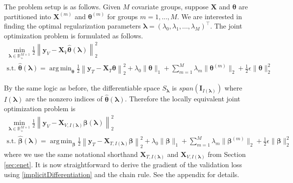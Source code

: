 \documentclass[12pt]{article}
\DeclareMathOperator*{\argmin}{arg\,min}
\begin{document}
The problem setup is as follows. Given $M$ covariate groups, suppose $\boldsymbol{X}$ and $\boldsymbol \theta$ are partitioned into $\boldsymbol{X}^{(m)}$ and $\boldsymbol \theta^{(m)}$ for groups $m = 1, ... , M$. We are interested in finding the optimal regularization parameters $\boldsymbol{\lambda} = (\lambda_0, \lambda_1, ...,  \lambda_M)^\top$. The joint optimization problem is formulated as follows.
\begin{equation}
\begin{array}{c}
\min_{\boldsymbol{\lambda} \in \mathbb{R}^{M+1}_{+}} \frac{1}{2}
\left \| \boldsymbol{y}_V - \boldsymbol{X}_V \hat{\boldsymbol{\theta}}(\boldsymbol{\lambda}) \right \|^2_2 \\
\text{s.t. }
\hat{\boldsymbol{\theta}}(\boldsymbol{\lambda}) =
\argmin_{\boldsymbol{\theta}} \frac{1}{2} 
\left \| \boldsymbol{y}_T - \boldsymbol{X}_T \boldsymbol{\theta} \right \|^2_2
+ \lambda_0 \| \boldsymbol\theta \|_1
+ \sum_{m=1}^M  \lambda_m \| \boldsymbol\theta^{(m)} \|_2
+ \frac{1}{2} \epsilon \| \boldsymbol\theta \|_2^2
\end{array}
\label{eq:unpooled_sgl}
\end{equation}

By the same logic as before, the differentiable space $S_{\boldsymbol \lambda}$ is $span(\boldsymbol I_{I(\boldsymbol\lambda)})$ where $I(\boldsymbol\lambda)$ are the nonzero indices of $\hat{\boldsymbol{\theta}}(\boldsymbol{\lambda})$. Therefore the locally equivalent joint optimization problem is
\begin{equation}
\begin{array}{c}
\min_{\boldsymbol{\lambda} \in \mathbb{R}^{M+1}_{+}} \frac{1}{2} \left \| \boldsymbol{y}_V - \boldsymbol X_{V,I(\boldsymbol\lambda)} \hat{\boldsymbol\beta}(\boldsymbol{\lambda}) \right \|^2_2 \\
\text{s.t. }
\hat{\boldsymbol{\beta}}(\boldsymbol{\lambda}) = \argmin_{\boldsymbol \beta}
\frac{1}{2} \left \| \boldsymbol{y}_T - \boldsymbol{X}_{T, I(\boldsymbol\lambda)} \boldsymbol \beta \right \|^2_2
+ \lambda_0 \| \boldsymbol \beta \|_1
+ \sum_{m=1}^M \lambda_m \| \boldsymbol \beta^{(m)} \|_2
+ \frac{1}{2}\epsilon \| \boldsymbol \beta \|_2^2
\end{array}
\end{equation}
where we use the same notational shorthand $\boldsymbol{X}_{T, I(\boldsymbol\lambda)}$ and $\boldsymbol{X}_{V, I(\boldsymbol\lambda)}$ from Section \ref{sec:enet}. It is now straightforward to derive the gradient of the validation loss using \eqref{implicitDifferentiation} and the chain rule. See the appendix for details.
\end{document}
